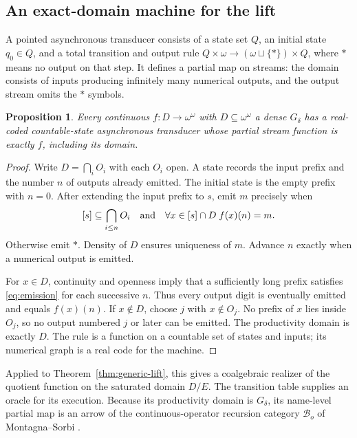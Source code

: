 \documentclass[11pt]{article}
\newtheorem{proposition}[theorem]{Proposition}
\theoremstyle{definition}
\newcommand{\N}{\omega}
\newcommand{\B}{\omega^\omega}
\begin{document}
\subsection{An exact-domain machine for the lift}

A pointed asynchronous transducer consists of a state set $Q$, an
initial state $q_0\in Q$, and a total transition and output rule
$Q\times\N\to(\N\sqcup\{\ast\})\times Q$, where $\ast$
means no output on that step. It defines a partial map on streams:
the domain consists of inputs producing infinitely many numerical
outputs, and the output stream omits the $\ast$ symbols.

\begin{proposition}\label{prop:transducer}
Every continuous $f:D\to\B$ with $D\subseteq\B$ a dense
$G_\delta$ has a real-coded countable-state asynchronous transducer
whose partial stream function is exactly $f$, including its domain.
\end{proposition}
\begin{proof}
Write $D=\bigcap_i O_i$ with each $O_i$ open. A state records
the input prefix and the number $n$ of outputs already emitted.
The initial state is the empty prefix with $n=0$.
After extending the input prefix to $s$, emit $m$ precisely when
\begin{equation}\label{eq:emission}
 [s]\subseteq\bigcap_{i\leq n}O_i
 \quad\hbox{and}\quad
 \forall x\in[s]\cap D\; f(x)(n)=m.
\end{equation}
Otherwise emit $\ast$. Density of $D$ ensures uniqueness of $m$.
Advance $n$ exactly when a numerical output is emitted.

For $x\in D$, continuity and openness imply that a sufficiently
long prefix satisfies \eqref{eq:emission} for each successive $n$.
Thus every output digit is eventually emitted and equals $f(x)(n)$.
If $x\notin D$, choose $j$ with $x\notin O_j$. No prefix
of $x$ lies inside $O_j$, so no output numbered $j$ or later
can be emitted. The productivity domain is exactly $D$.
The rule is a function on a countable set of states and inputs;
its numerical graph is a real code for the machine.
\end{proof}

Applied to Theorem~\ref{thm:generic-lift}, this gives a coalgebraic
realizer of the quotient function on the saturated domain $D/E$.
The transition table supplies an oracle for its execution. Because
its productivity domain is $G_\delta$, its name-level partial map
is an arrow of the continuous-operator recursion category
$\mathcal B_o$ of Montagna--Sorbi
\cite[Lemma 2.5, Definition 2.2, and Proposition 3.1]{MontagnaSorbi}.
\end{document}
